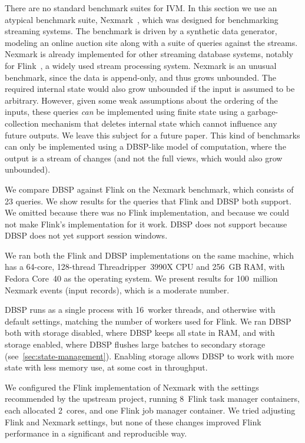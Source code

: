 \documentclass[twocolumn
]{svjour3}
\numberwithin{equation}{section}
\newcommand{\dbsp}{DBSP\xspace}
\begin{document}
There are no standard benchmark suites for IVM.  In this section we
use an atypical benchmark suite, Nexmark~\cite{tucker2008nexmark},
which was designed for benchmarking streaming systems.  The benchmark
is driven by a synthetic data generator, modeling an online
auction site along with a suite of queries against the streams.
Nexmark is already implemented for other streaming database systems,
notably for Flink~\cite{carbone-ieee15,nexmark-flink}, a widely used
stream processing system.  Nexmark is an unusual benchmark, since the
data is append-only, and thus grows unbounded.  The required internal
state would also grow unbounded if the input is assumed to be
arbitrary.  However, given some weak assumptions about the ordering of
the inputs, these queries \emph{can} be implemented using finite state
using a garbage-collection mechanism that deletes internal state which
cannot influence any future outputs.  We leave this subject for a
future paper.  This kind of benchmarks can only be implemented using a
\dbsp-like model of computation, where the output is a stream of
changes (and not the full views, which would also grow unbounded).

We compare \dbsp against Flink on the Nexmark benchmark, which
consists of 23 queries.  We show results for the queries that Flink
and \dbsp both support.  We omitted  because there was no
Flink implementation, and  because we could not make
Flink's implementation for it work.  \dbsp does not support
 because \dbsp does not yet support session windows.

We ran both the Flink and \dbsp implementations on the same machine,
which has a 64-core, 128-thread Threadripper~3990X CPU and 256~GB RAM,
with Fedora Core~40 as the operating system. We present results for
100~million Nexmark events (input records), which is a moderate
number.

\dbsp runs as a single process with 16~worker threads, and otherwise
with default settings, matching the number of workers used for Flink.
We ran \dbsp both with storage disabled, where \dbsp keeps all state
in RAM, and with storage enabled, where \dbsp flushes large batches to
secondary storage (see~\ref{sec:state-management}).  Enabling storage
allows \dbsp to work with more state with less memory use, at some
cost in throughput.

We configured the Flink implementation of Nexmark with the settings
recommended by the upstream project, running 8~Flink task manager
containers, each allocated 2~cores, and one Flink job manager
container.  We tried adjusting Flink and Nexmark settings, but none of
these changes improved Flink performance in a significant and
reproducible way.
\end{document}
